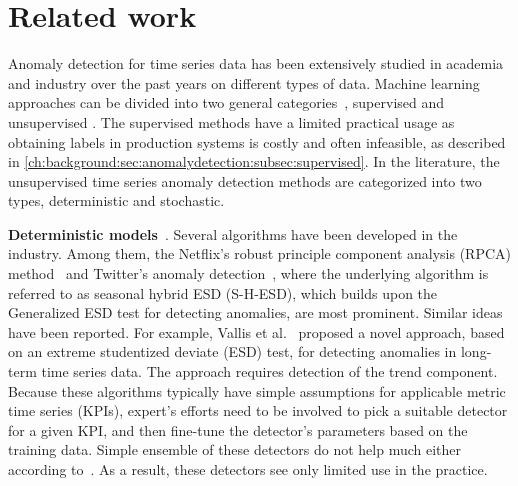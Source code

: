 \section{Related work} \label{related_work}
Anomaly detection for time series data has been extensively studied in academia and industry over the past years on different types of data. Machine learning approaches can be divided into two general categories~\cite{schmidt2018iftm}, supervised \cite{Breiman2001, joshi2001mining, joshi2002predicting, chawla2004special} and unsupervised \cite{fichtenberger2013bico,kanungo2002efficient, liu2008isolation, manevitz2001one}. The supervised methods have a limited practical usage as obtaining labels in production systems is costly and often infeasible, as described in \autoref{ch:background:sec:anomalydetection:subsec:supervised}. In the literature, the unsupervised time series anomaly detection methods are categorized into two types, deterministic and stochastic.

\textbf{Deterministic models}~\cite{malhotra2015long,filonov2016multivariate,vallis2014novel,donut,netflix,vrushali2016anomaly,Hundman:2018:DSA:3219819.3219845}. 
Several algorithms have been developed in the industry. Among them, the Netflix's robust principle component analysis (RPCA) method~\cite{netflix} and Twitter's anomaly detection~\cite{vallis2014novel}, where the underlying algorithm is referred to as seasonal hybrid ESD (S-H-ESD), which builds upon the Generalized ESD test for detecting anomalies, are most prominent. Similar ideas have been reported. For example, Vallis et al.~\cite{vallis2014novel} proposed a novel approach, based on an extreme studentized deviate (ESD) test, for detecting anomalies in long-term time series data. The approach requires detection of the trend component. Because these algorithms typically have simple assumptions for applicable metric time series (KPIs), expert's efforts need to be involved to pick a suitable detector for a given KPI, and then fine-tune the detector's parameters based on the training data. Simple ensemble of these detectors do not help much either according to~\cite{liu2015opprentice}. As a result, these detectors see only limited use in the practice. 

